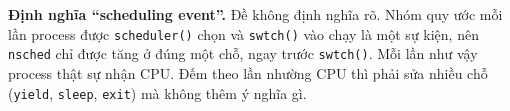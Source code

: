 \item \textbf{Định nghĩa ``scheduling event''.} Đề không định nghĩa rõ. Nhóm quy ước mỗi lần process được \texttt{scheduler()} chọn và \texttt{swtch()} vào chạy là một sự kiện, nên \texttt{nsched} chỉ được tăng ở đúng một chỗ, ngay trước \texttt{swtch()}. Mỗi lần như vậy process thật sự nhận CPU. Đếm theo lần nhường CPU thì phải sửa nhiều chỗ (\texttt{yield}, \texttt{sleep}, \texttt{exit}) mà không thêm ý nghĩa gì.
